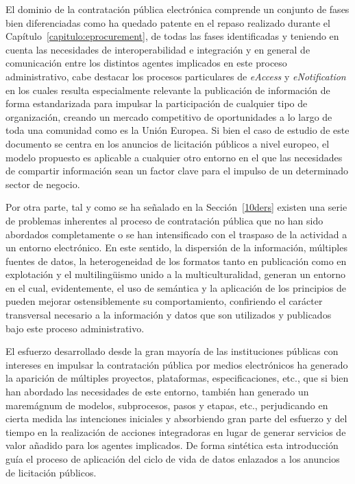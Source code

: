 El dominio de la contratación pública electrónica comprende un conjunto de fases bien diferenciadas 
como ha quedado patente en el repaso realizado durante el Capítulo~\ref{capitulo:eprocurement}, de todas las 
fases identificadas y teniendo en cuenta las necesidades de interoperabilidad e integración y en general 
de comunicación entre los distintos agentes implicados en este proceso administrativo, cabe destacar 
los procesos particulares de \textit{eAccess} y \textit{eNotification} en los cuales resulta 
especialmente relevante la publicación de información de forma estandarizada para impulsar 
la participación de cualquier tipo de organización, creando un mercado competitivo de oportunidades 
a lo largo de toda una comunidad como es la Unión Europea. Si bien el caso de estudio de este documento 
se centra en los anuncios de licitación públicos a nivel europeo, el modelo propuesto es aplicable a 
cualquier otro entorno en el que las necesidades de compartir información sean un factor clave 
para el impulso de un determinado sector de negocio.

Por otra parte, tal y como se ha señalado en la Sección~\ref{10ders} existen una serie de problemas 
inherentes al proceso de contratación pública que no han sido abordados completamente o 
se han intensificado con el traspaso de la actividad a un entorno electrónico. En este sentido, 
la dispersión de la información, múltiples fuentes de datos, la heterogeneidad de los formatos tanto 
en publicación como en explotación y el multiling\"{u}ismo unido a la multiculturalidad, generan un entorno 
en el cual, evidentemente, el uso de semántica y la aplicación de los principios de \linkeddata pueden 
mejorar ostensiblemente su comportamiento, confiriendo el carácter transversal necesario a la información 
y datos que son utilizados y publicados bajo este proceso administrativo.

El esfuerzo desarrollado desde la gran mayoría de las instituciones públicas con intereses 
en impulsar la contratación pública por medios electrónicos ha generado la aparición de múltiples proyectos, 
plataformas, especificaciones, etc., que si bien han abordado las necesidades de este entorno, también 
han generado un maremágnum de modelos, subprocesos, pasos y etapas, etc., perjudicando en cierta medida 
las intenciones iniciales y absorbiendo gran parte del esfuerzo y del tiempo en la realización de 
acciones integradoras en lugar de generar servicios de valor añadido para los agentes 
implicados. De forma sintética esta introducción guía el proceso de aplicación del ciclo de vida 
de datos enlazados a los anuncios de licitación públicos.

